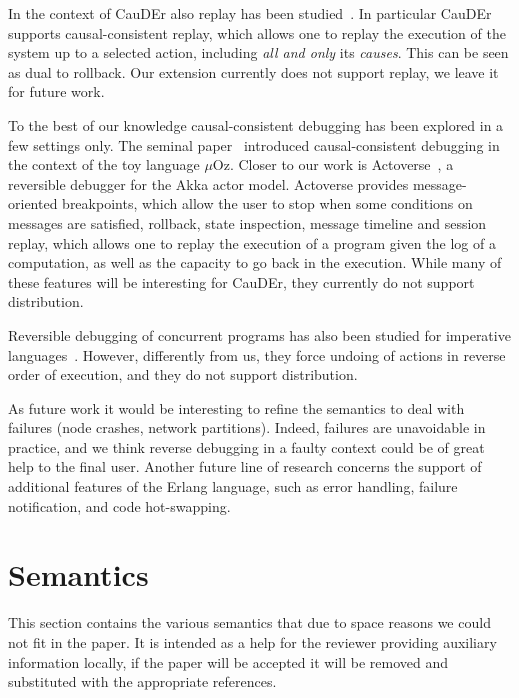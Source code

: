 \documentclass[runningheads]{llncs}
\begin{document}
In the context of CauDEr also replay has been
studied~\cite{LanesePV21}. In particular CauDEr supports
causal-consistent replay, which allows one to replay the execution of
the system up to a selected action, including \emph{all and only} its
\emph{causes}. This can be seen as dual to rollback.  Our extension
currently does not support replay, we leave it for future work.

To the best of our knowledge causal-consistent debugging has been
explored in a few settings only. The seminal paper~\cite{GiachinoLM14}
introduced causal-consistent debugging in the context of the toy
language $\mu$Oz. Closer to our work is
Actoverse~\cite{paper:actoverse}, a reversible
debugger for the Akka actor model.  Actoverse provides
message-oriented breakpoints, which allow the user to stop when some
conditions on messages are satisfied, rollback, state inspection,
message timeline and session replay, which allows one to replay the
execution of a program given the log of a computation, as well as the capacity
to go back in the execution. While many of these features will be interesting for CauDEr, they currently do not support distribution.

Reversible debugging of concurrent programs has also been studied for
imperative languages~\cite{HoeyU19}. However, differently from us,
they force undoing of actions in reverse order of execution, and they
do not support distribution.
 


As future work it would be interesting to refine the semantics to deal with failures (node crashes, network partitions). 
Indeed, failures are unavoidable in practice, and we think reverse debugging in a faulty context could be of great help to the final user. Another future line of research concerns the support of additional features of the Erlang language, such as error handling, failure notification, and code hot-swapping.




\newpage

\appendix


\section{Semantics}\label{app:semantics}
This section contains the various semantics that due to space reasons we could
not fit in the paper. It is intended as a help for the reviewer providing
auxiliary information locally, if the
paper will be accepted it will be removed and substituted with the appropriate
references.  
\end{document}
